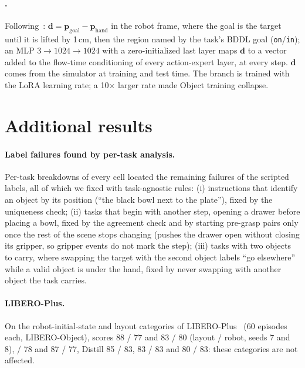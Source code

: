 \paragraph{\pt.}
Following~\cite{tsai2026point}: $\mathbf{d}=\mathbf{p}_{\text{goal}}-\mathbf{p}_{\text{hand}}$ in the robot frame, where
the goal is the target until it is lifted by 1\,cm, then the region named by the task's BDDL goal (\texttt{on}/\texttt{in});
an MLP $3\to1024\to1024$ with a zero-initialized last layer maps $\mathbf{d}$ to a vector added to the flow-time
conditioning of every action-expert layer, at every step. $\mathbf{d}$ comes from the simulator at training and test time.
The branch is trained with the LoRA learning rate; a 10$\times$ larger rate made Object training collapse.

\section{Additional results}
\label{sec:supp:results}

\paragraph{Label failures found by per-task analysis.}
Per-task breakdowns of every cell located the remaining failures of the scripted labels, all of which we fixed with
task-agnostic rules: (i) instructions that identify an object by its position (``the black bowl next to the plate''),
fixed by the uniqueness check; (ii) tasks that begin with another step, \eg opening a drawer before placing a bowl, fixed by
the agreement check and by starting pre-grasp pairs only once the rest of the scene stops changing (\pizf pushes the drawer
open without closing its gripper, so gripper events do not mark the step); (iii) tasks with two objects to carry, where
swapping the target with the second object labels ``go elsewhere'' while a valid object is under the hand, fixed by never
swapping with another object the task carries. 

\paragraph{LIBERO-Plus.}
On the robot-initial-state and layout categories of LIBERO-Plus~\cite{fei2025liberoplus} (60 episodes each, LIBERO-Object),
\ours scores 88 / 77 and 83 / 80 (layout / robot, seeds 7 and 8),  / 78 and 87 / 77, Distill 85 / 83, 83 / 83 and
80 / 83: these categories are not affected.

